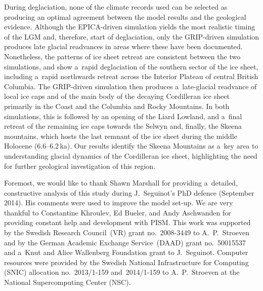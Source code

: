 \documentclass[tc, manuscript]{copernicus}
\begin{document}
      During deglaciation, none of the climate records used can be selected
      as producing an optimal agreement between the model results and the
      geological evidence. Although the EPICA-driven simulation yields the
      most realistic timing of the LGM and, therefore, start of
      deglaciation, only the GRIP-driven simulation produces late glacial
      readvances in areas where these have been documented. Nonetheless, the
      patterns of ice sheet retreat are consistent between the two
      simulations, and show a~rapid deglaciation of the southern sector of
      the ice sheet, including a~rapid northwards retreat across the
      Interior Plateau of central British Columbia. The GRIP-driven
      simulation then produces a~late-glacial readvance of local ice caps
      and of the main body of the decaying Cordilleran ice sheet primarily
      in the Coast and the Columbia and Rocky Mountains. In both
      simulations, this is followed by an opening of the Liard Lowland, and
      a~final retreat of the remaining ice caps towards the Selwyn and,
      finally, the Skeena mountains, which hosts the last remnant of the ice
      sheet during the middle Holocene (6.6--6.2\,\unit{ka}). Our results
      identify the Skeena Mountains as a~key area to understanding glacial
      dynamics of the Cordilleran ice sheet, highlighting the need for
      further geological investigation of this region.







\begin{acknowledgements}
      Foremost, we would like to thank Shawn Marshall for providing
      a~detailed, constructive analysis of this study during J.~Seguinot's
      PhD defence (September 2014). His comments were used to improve the
      model set-up. We are very thankful to Constantine Khroulev, Ed Bueler,
      and Andy Aschwanden for providing constant help and development with
      PISM. This work was supported by the Swedish Research Council~(VR)
      grant no.~2008-3449 to A.~P.~Stroeven and by the German Academic
      Exchange Service~(DAAD) grant no.~50015537 and a~Knut and Alice
      Wallenberg Foundation grant to J.~Seguinot. Computer resources were
      provided by the Swedish National Infrastructure for Computing (SNIC)
      allocation no.~2013/1-159 and~2014/1-159 to A.~P.~Stroeven at the
      National Supercomputing Center (NSC).
\end{acknowledgements}
\end{document}

